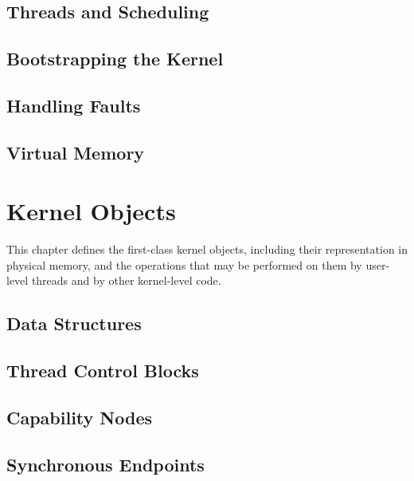 \documentclass[a4paper,11pt,twoside]{report}
\begin{document}
\section{Threads and Scheduling}\label{sec:kernel.thread}


\section{Bootstrapping the Kernel}\label{sec:kernel.init}


\section{Handling Faults}\label{sec:kernel.faulthandler}


\section{Virtual Memory}\label{sec:kernel.vspace}


\chapter{Kernel Objects}\label{sec:object}

This chapter defines the first-class kernel objects, including their representation in physical memory, and the operations that may be performed on them by user-level threads and by other kernel-level code.

\section{Data Structures}\label{sec:object.structures}


\section{Thread Control Blocks}\label{sec:object.tcb}


\section{Capability Nodes}\label{sec:object.cnode}


\section{Synchronous Endpoints}\label{sec:object.endpoint}

\end{document}
